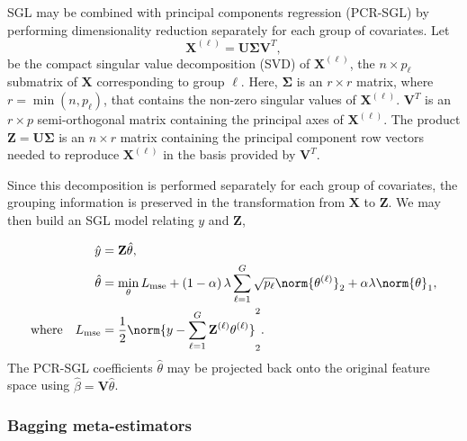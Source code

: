 \documentclass[10pt,letterpaper]{article}
\begin{document}
SGL may be combined with principal components regression (PCR-SGL) by performing dimensionality reduction separately for each group of covariates. Let
\begin{equation}
    \mathbf{X}^{(\ell)} = \mathbf{U} \mathbf{\Sigma} \mathbf{V}^T,
    \label{eq:svd}
\end{equation}
be the compact singular value decomposition (SVD) of \protect$\mathbf{X}^{(\ell)}$, the \protect$n \times p_\ell$ submatrix of \protect$\mathbf{X}$ corresponding to group \protect$\ell$. Here, \protect$\mathbf{\Sigma}$ is an \protect$r \times r$ matrix, where \protect$r = \min(n, p_\ell)$, that contains the non-zero singular values of \protect$\mathbf{X}^{(\ell)}$. \protect$\mathbf{V}^T$ is an \protect$r \times p$ semi-orthogonal matrix containing the principal axes of \protect$\mathbf{X}^{(\ell)}$. The product \protect$\mathbf{Z} = \mathbf{U \Sigma}$ is an \protect$n \times r$ matrix containing the principal component row vectors needed to reproduce \protect$\mathbf{X}^{(\ell)}$ in the basis provided by \protect$\mathbf{V}^T$.

Since this decomposition is performed separately for each group of covariates, the grouping information is preserved in the transformation from \protect$\mathbf{X}$ to \protect$\mathbf{Z}$. We may then build an SGL model relating \protect$y$ and \protect$\mathbf{Z}$,

\begin{align}
    \hat{y} &= \mathbf{Z} \hat{\theta}, \\
    \hat{\theta} &= \min_\theta L_{\text{mse}}
    + \left( 1 - \alpha \right) \lambda \displaystyle \sum_{\ell = 1}^{G}
    \sqrt{p_\ell} \norm{\theta^{(\ell)}}_2
    + \alpha \lambda \norm{\theta}_1, \\%
    \text{where} \quad
    L_{\text{mse}} &= \frac{1}{2}
    \norm{y - \displaystyle \sum_{\ell = 1}^{G}
    \mathbf{Z}^{(\ell)} \theta^{(\ell)}}_2^2.
    \label{eq:pcr-sgl}
\end{align}
The PCR-SGL coefficients \protect$\hat{\theta}$ may be projected back onto the original feature space using \protect$\hat{\beta} = \mathbf{V} \hat{\theta}$.

\subsubsection*{Bagging meta-estimators}
\end{document}
